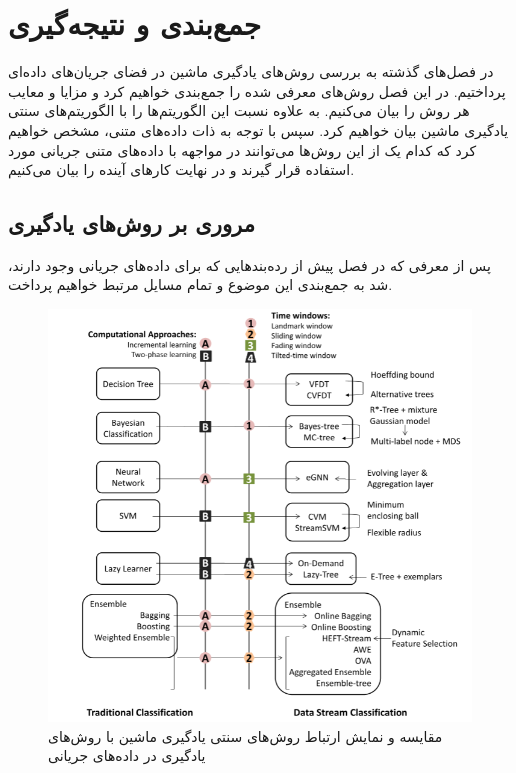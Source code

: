 \chapter{جمع‌بندی و نتیجه‌گیری}
\thispagestyle{empty}

در فصل‌های گذشته به بررسی روش‌های یادگیری ماشین در فضای جریان‌های داده‌ای پرداختیم. در این فصل روش‌های معرفی شده را جمع‌بندی خواهیم کرد و مزایا و معایب هر روش را بیان می‌کنیم. به علاوه نسبت این الگوریتم‌ها را با الگوریتم‌های سنتی یادگیری ماشین بیان‌ خواهیم کرد. سپس با توجه به ذات داده‌های متنی، مشخص‌ خواهیم کرد که کدام یک از این روش‌ها می‌توانند در مواجهه با داده‌های متنی جریانی مورد استفاده قرار گیرند و در نهایت کارهای آینده را بیان می‌کنیم.

\section{مروری بر روش‌های یادگیری}\label{sec4}
پس از معرفی که در فصل پیش از رده‌بندهایی که برای داده‌های جریانی وجود دارند، شد به جمع‌بندی این موضوع و تمام مسایل مرتبط خواهیم پرداخت.

\begin{figure}%
\centerline{\includegraphics[width=15cm]{compare}}
\caption{مقایسه و نمایش ارتباط روش‌های سنتی یادگیری ماشین با رو‌ش‌های یادگیری در داده‌های جریانی}
\label{fig:compare}
\end{figure}

